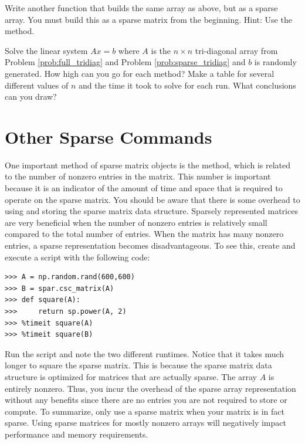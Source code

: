 \begin{problem}
Write another function that builds the same array as above, but as a sparse array.
You must build this as a sparse matrix from the beginning.
Hint: Use the  method.
\label{prob:sparse_tridiag}
\end{problem}

\begin{problem}
Solve the linear system $Ax = b$ where $A$ is the $n\times n$
tri-diagonal array from Problem \ref{prob:full_tridiag} and Problem \ref{prob:sparse_tridiag} and $b$ is randomly
generated.  How high can you go for each method?  Make a table for
several different values of $n$ and the time it took to solve for
each run.  What conclusions can you draw?
\end{problem}


\section*{Other Sparse Commands}
One important method of sparse matrix objects is the  method,
which is related to the number of nonzero entries in the matrix.
This number is important because it is an indicator of the amount of time and space
that is required to operate on the sparse matrix.
You should be aware that there is some overhead to using and storing the sparse matrix data structure.
Sparsely represented matrices are very beneficial when the number of
nonzero entries is relatively small compared to the total number of entries.
When the matrix has many nonzero entries, a sparse representation becomes disadvantageous.
To see this, create and execute a script with the following code:
\begin{lstlisting}
>>> A = np.random.rand(600,600)
>>> B = spar.csc_matrix(A)
>>> def square(A):
>>>     return sp.power(A, 2)
>>> %timeit square(A)
>>> %timeit square(B)
\end{lstlisting}
Run the script and note the two different runtimes.
Notice that it takes much longer to square the sparse matrix.
This is because the sparse matrix data structure is optimized for matrices that are actually sparse.
The array $A$ is entirely nonzero.
Thus, you incur the overhead of the sparse array representation without any
benefits since there are no entries you are not required to store or compute.
To summarize, only use a sparse matrix when your matrix is in fact sparse.
Using sparse matrices for mostly nonzero arrays will negatively impact performance and memory requirements.

